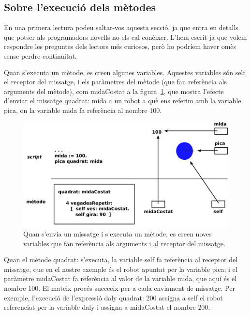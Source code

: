 \subsection{Sobre l'execució dels mètodes}
En una primera lectura podeu saltar-vos aquesta secció, ja que entra en detalls que potser als programadors novells no els cal conèixer. L'hem escrit ja que volem respondre les preguntes dels lectors més curiosos, però ho podríem haver omès sense perdre continuitat.

Quan s'executa un mètode, es creen algunes variables. Aquestes variables són \textsf{self}, el receptor del missatge, i els paràmetres del mètode (que fan referència als arguments del mètode), com \textsf{midaCostat} a la figura~\ref{fig1404}, que mostra l'efecte d'enviar el missatge \textsf{quadrat: mida} a un robot a què ens referim amb la variable \textsf{pica}, on la variable \textsf{mida} fa referència al nombre \textsf{100}.
\begin{figure}[h]
\begin{center}
\includegraphics[scale=0.65]{Imatges/figura14-4.pdf}
\end{center}
\caption{Quan s'envia un missatge i s'executa un mètode, es creen noves variables que fan referència als arguments i al receptor del missatge.}
\label{fig1404}
\end{figure}

Quan el mètode \textsf{quadrat:} s'executa, la variable \textsf{self} fa referència al receptor del missatge, que en el nostre exemple és el robot apuntat per la variable \textsf{pica}; i el paràmetre \textsf{midaCostat} fa referència al valor de la variable \textsf{mida}, que aquí és el nombre \textsf{100}. El mateix procés succeeix per a cada enviament de missatge. Per exemple, l'execució de l'expressió \textsf{daly quadrat: 200} assigna a \textsf{self} el robot referenciat per la variable \textsf{daly} i assigna a \textsf{midaCostat} el nombre \textsf{200}.

